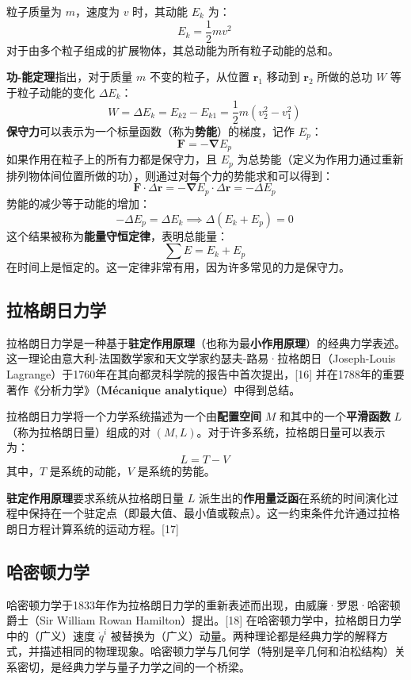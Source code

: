 粒子质量为 \( m \)，速度为 \( v \) 时，其动能 \( E_k \) 为：  
\[
E_k = \frac{1}{2} m v^2~
\]  
对于由多个粒子组成的扩展物体，其总动能为所有粒子动能的总和。  

\textbf{功-能定理}指出，对于质量 \( m \) 不变的粒子，从位置 \( \mathbf{r}_1 \) 移动到 \( \mathbf{r}_2 \) 所做的总功 \( W \) 等于粒子动能的变化 \( \Delta E_k \)：  
\[
W = \Delta E_k = E_{k2} - E_{k1} = \frac{1}{2} m \left(v_2^2 - v_1^2\right)~
\]  
\textbf{保守力}可以表示为一个标量函数（称为\textbf{势能}）的梯度，记作 \( E_p \)：  
\[
\mathbf{F} = -\mathbf{\nabla} E_p~
\]  
如果作用在粒子上的所有力都是保守力，且 \( E_p \) 为总势能（定义为作用力通过重新排列物体间位置所做的功），则通过对每个力的势能求和可以得到：  
\[
\mathbf{F} \cdot \Delta \mathbf{r} = -\mathbf{\nabla} E_p \cdot \Delta \mathbf{r} = -\Delta E_p~
\]  
势能的减少等于动能的增加：  
\[
-\Delta E_p = \Delta E_k \implies \Delta (E_k + E_p) = 0~
\]  
这个结果被称为\textbf{能量守恒定律}，表明总能量：  
\[
\sum E = E_k + E_p~
\]  
在时间上是恒定的。这一定律非常有用，因为许多常见的力是保守力。
\subsection{拉格朗日力学} 
拉格朗日力学是一种基于\textbf{驻定作用原理}（也称为最\textbf{小作用原理}）的经典力学表述。这一理论由意大利-法国数学家和天文学家约瑟夫-路易·拉格朗日（Joseph-Louis Lagrange）于1760年在其向都灵科学院的报告中首次提出，[16] 并在1788年的重要著作《分析力学》（\textbf{Mécanique analytique}）中得到总结。  

拉格朗日力学将一个力学系统描述为一个由\textbf{配置空间} \( M \) 和其中的一个\textbf{平滑函数} \( L \)（称为拉格朗日量）组成的对 \( (M, L) \)。对于许多系统，拉格朗日量可以表示为：  
\[
L = T - V~
\]  
其中，\( T \) 是系统的动能，\( V \) 是系统的势能。  

\textbf{驻定作用原理}要求系统从拉格朗日量 \( L \) 派生出的\textbf{作用量泛函}在系统的时间演化过程中保持在一个驻定点（即最大值、最小值或鞍点）。这一约束条件允许通过拉格朗日方程计算系统的运动方程。[17]
\subsection{哈密顿力学}  
哈密顿力学于1833年作为拉格朗日力学的重新表述而出现，由威廉·罗恩·哈密顿爵士（Sir William Rowan Hamilton）提出。[18] 在哈密顿力学中，拉格朗日力学中的（广义）速度 \( \dot{q}^i \) 被替换为（广义）动量。两种理论都是经典力学的解释方式，并描述相同的物理现象。哈密顿力学与几何学（特别是辛几何和泊松结构）关系密切，是经典力学与量子力学之间的一个桥梁。  

